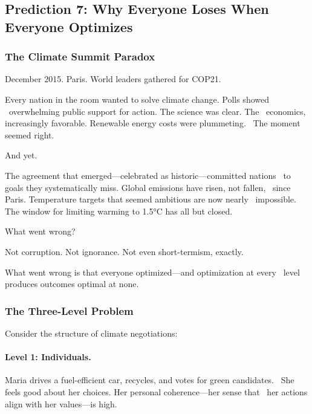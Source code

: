 \subsection{Prediction 7: Why Everyone Loses When Everyone Optimizes}
\label{subsec:pred7-multilevel}


\subsubsection{The Climate Summit Paradox}

December 2015. Paris. World leaders gathered for COP21.

Every nation in the room wanted to solve climate change. Polls showed \
overwhelming public support for action. The science was clear. The \
economics, increasingly favorable. Renewable energy costs were plummeting. \
The moment seemed right.

And yet.

The agreement that emerged---celebrated as historic---committed nations \
to goals they systematically miss. Global emissions have risen, not fallen, \
since Paris. Temperature targets that seemed ambitious are now nearly \
impossible. The window for limiting warming to 1.5°C has all but closed.

What went wrong?

Not corruption. Not ignorance. Not even short-termism, exactly.

What went wrong is that everyone optimized---and optimization at every \
level produces outcomes optimal at none.

\subsubsection{The Three-Level Problem}

Consider the structure of climate negotiations:

\paragraph{Level 1: Individuals.}

Maria drives a fuel-efficient car, recycles, and votes for green candidates. \
She feels good about her choices. Her personal coherence---her sense that \
her actions align with her values---is high.

